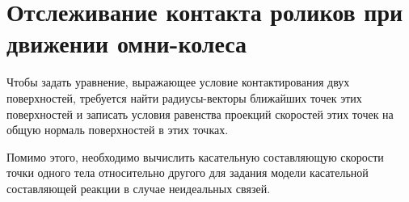 \section{Отслеживание контакта роликов при движении омни-колеса}\label{sect:track_omni}


Чтобы задать уравнение, выражающее условие контактирования двух поверхностей, требуется найти радиусы-векторы ближайших точек этих поверхностей и записать условия равенства проекций скоростей этих точек на общую нормаль поверхностей в этих точках.

Помимо этого, необходимо вычислить касательную составляющую скорости точки одного тела относительно другого для задания модели касательной составляющей реакции в случае неидеальных связей.






